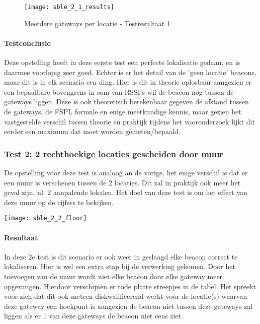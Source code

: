 \begin{figure}[h]
	\texttt{[image: sble\_2\_1\_results]}
	\caption{Meerdere gateways per locatie - Testresultaat 1}
	\label{fig:ond-ble-static-2-1-res}
\end{figure}

\paragraph{Testconclusie}
Deze opstelling heeft in deze eerste test een perfecte lokalisatie gedaan, en is daarmee voorlopig zeer goed. Echter is er het detail van de 'geen locatie' beacons, maar dit is in elk scenario een ding. Hier is dit in theorie oplosbaar aangezien er een bepaalbare bovengrens in som van RSSI's wil de beacon nog tussen de gateways liggen. Deze is ook theoretisch berekenbaar gegeven de afstand tussen de gateways, de FSPL formule en enige meetkundige kennis, maar gezien het vastgestelde verschil tussen theorie en praktijk tijdens het vooronderzoek lijkt dit eerder een maximum dat moet worden gemeten/bepaald.

\subsubsection{Test 2: 2 rechthoekige locaties gescheiden door muur}
\begin{minipage}{0.55\textwidth}
De opstelling voor deze test is analoog an de vorige, het enige verschil is dat er een muur is verschenen tussen de 2 locaties. Dit zal in praktijk ook meer het geval zijn, nl. 2 aanpalende lokalen. Het doel van deze test is om het effect van deze muur op de cijfers te bekijken.
\end{minipage}
\hfill
\begin{minipage}{0.42\textwidth}
	\texttt{[image: sble\_2\_2\_floor]}
	\label{fig:ond-ble-static-2-2-ops}
\end{minipage}

\paragraph{Resultaat}
In deze 2e test is dit scenario er ook weer in geslaagd elke beacon correct te lokaliseren. Hier is wel een extra stap bij de verwerking gekomen. Door het toevoegen van de muur wordt niet elke beacon door elke gateway meer opgevangen. Hierdoor verschijnen er rode platte streepjes in de tabel. Het spreekt voor zich dat dit ook meteen diskwalificerend werkt voor de locatie(s) waarvan deze gateway een hoekpunt is aangezien de beacon niet tussen deze gateways zal liggen als er 1 van deze gateways de beacon niet eens ziet.

